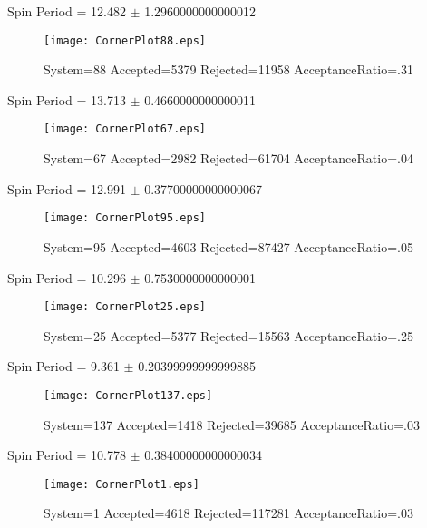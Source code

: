 \documentclass[10pt]{article}
\begin{document}
\newpage
\begin{center}
        Spin Period = 12.482 $\pm$ 1.2960000000000012
        \end{center}
\begin{figure}[H] 
        \texttt{[image: CornerPlot88.eps]}
        \caption{System=88 Accepted=5379 Rejected=11958 AcceptanceRatio=.31}
        \label{S88}
        \centering
        \end{figure}
\newpage
\begin{center}
        Spin Period = 13.713 $\pm$ 0.4660000000000011
        \end{center}
\begin{figure}[H] 
        \texttt{[image: CornerPlot67.eps]}
        \caption{System=67 Accepted=2982 Rejected=61704 AcceptanceRatio=.04}
        \label{S67}
        \centering
        \end{figure}
\newpage
\begin{center}
        Spin Period = 12.991 $\pm$ 0.37700000000000067
        \end{center}
\begin{figure}[H] 
        \texttt{[image: CornerPlot95.eps]}
        \caption{System=95 Accepted=4603 Rejected=87427 AcceptanceRatio=.05}
        \label{S95}
        \centering
        \end{figure}
\newpage
\begin{center}
        Spin Period = 10.296 $\pm$ 0.7530000000000001
        \end{center}
\begin{figure}[H] 
        \texttt{[image: CornerPlot25.eps]}
        \caption{System=25 Accepted=5377 Rejected=15563 AcceptanceRatio=.25}
        \label{S25}
        \centering
        \end{figure}
\newpage
\begin{center}
        Spin Period = 9.361 $\pm$ 0.20399999999999885
        \end{center}
\begin{figure}[H] 
        \texttt{[image: CornerPlot137.eps]}
        \caption{System=137 Accepted=1418 Rejected=39685 AcceptanceRatio=.03}
        \label{S137}
        \centering
        \end{figure}
\newpage
\begin{center}
        Spin Period = 10.778 $\pm$ 0.38400000000000034
        \end{center}
\begin{figure}[H] 
        \texttt{[image: CornerPlot1.eps]}
        \caption{System=1 Accepted=4618 Rejected=117281 AcceptanceRatio=.03}
        \label{S1}
        \centering
        \end{figure}
\end{document}
